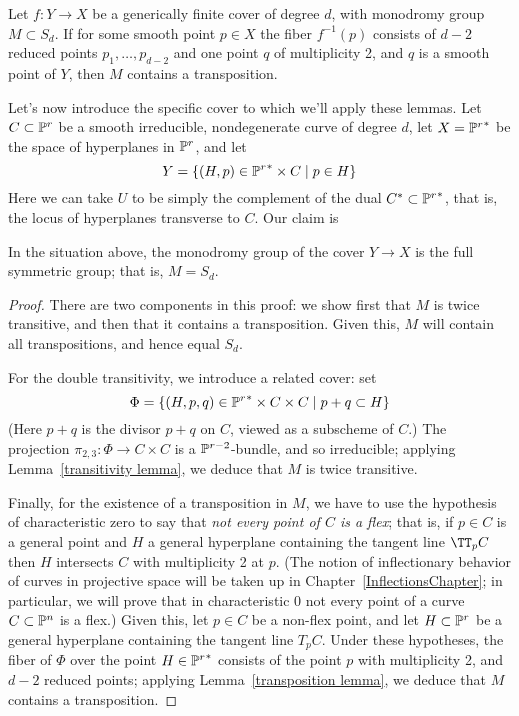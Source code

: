 \begin{lemma}\label{transposition lemma}
Let $f : Y \to X$ be a generically finite cover of degree $d$, with  monodromy group $M \subset S_d$. If for some smooth point $p \in X$ the fiber $f^{-1}(p)$ consists of $d-2$ reduced points $p_1,\dots, p_{d-2}$ and one point $q$ of multiplicity 2, and $q$ is a smooth point of $Y$, then $M$ contains a transposition.
\end{lemma}

Let's now introduce the specific cover to which we'll apply these lemmas. Let $C \subset \PP^r$ be a smooth irreducible, nondegenerate curve of degree $d$, let $X = {\PP^r}^*$ be the space of hyperplanes in $\PP^r$, and let
$$
Y = \{ (H, p) \in {\PP^r}^* \times C \mid p \in H \}
$$
Here we can take $U$ to be simply the complement of the dual $C^* \subset {\PP^r}^*$, that is, the locus of hyperplanes transverse to $C$. Our claim is

\begin{proposition}\label{monodromy of hyperplane section}
In the situation above, the monodromy group of the cover $Y \to X$ is the full symmetric group; that is, $M = S_d$.
\end{proposition}

\begin{proof}
There are two components in this proof: we show first that $M$ is twice transitive, and then that it contains a transposition. Given this, $M$ will contain all transpositions, and hence equal $S_d$.

For the double transitivity, we introduce a related cover: set
$$
\Phi = \{ (H, p, q) \in {\PP^r}^* \times C \times C \mid p + q \subset H \}
$$
(Here $p+q$ is the divisor $p+q$ on $C$, viewed as a subscheme of $C$.) The projection $\pi_{2,3} : \Phi \to C \times C$ is a $\PP^{r-2}$-bundle, and so irreducible; applying Lemma~\ref{transitivity lemma}, we deduce that $M$ is twice transitive.

Finally, for the existence of a transposition in $M$, we have to use the hypothesis of characteristic zero to say that \emph{not every point of $C$ is a flex}; that is, if $p\in C$ is a general point and $H$ a general hyperplane containing the tangent line $\TT_pC$ then $H$ intersects $C$ with multiplicity 2 at $p$. (The notion of inflectionary behavior of curves in projective space will be taken up in Chapter~\ref{InflectionsChapter}; in particular, we will prove that in characteristic 0 not every point of  a curve $C\subset \PP^n$ is a flex.) Given this, let $p \in C$ be a non-flex point, and let $H \subset \PP^r$ be a general hyperplane containing the tangent line $T_pC$. Under these hypotheses, the fiber of $\Phi$ over the point $H \in {\PP^r}^*$ consists of the point $p$ with multiplicity 2, and $d-2$ reduced points; applying Lemma~\ref{transposition lemma}, we deduce that $M$ contains a transposition.
\end{proof}

